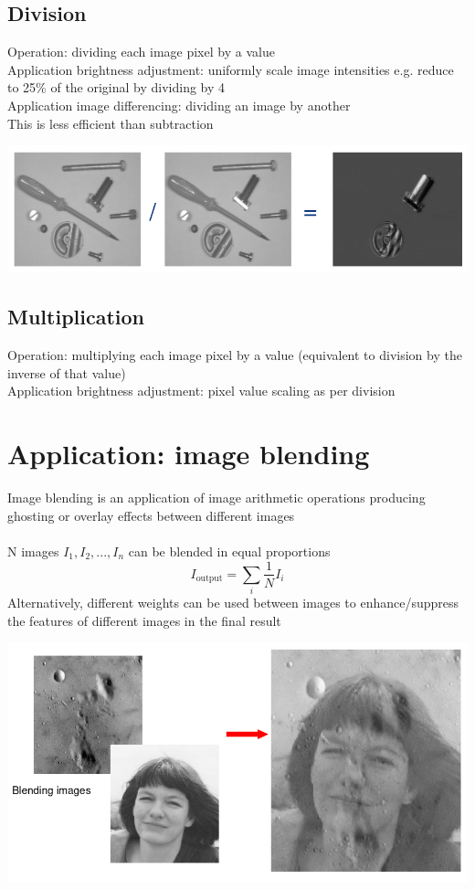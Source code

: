 \documentclass{article}[18pt]
\begin{document}
\subsection{Division}
Operation: dividing each image pixel by a value\\
Application brightness adjustment: uniformly scale image intensities e.g. reduce to 25\% of the original by dividing by 4\\
Application image differencing: dividing an image by another\\
This is less efficient than subtraction
\begin{center}
	\includegraphics[scale=0.7]{division}
\end{center}
\subsection{Multiplication}
Operation: multiplying each image pixel by a value (equivalent to division by the inverse of that value)\\
Application brightness adjustment: pixel value scaling as per division 
\section{Application: image blending}
Image blending is an application of image arithmetic operations producing ghosting or overlay effects between different images\\
\\
N images $I_1,I_2,...,I_n$ can be blended in equal proportions
\[
I_{\text {output}}=\sum_{i} \frac{1}{N} I_{i}
\]
Alternatively, different weights can be used between images to enhance/suppress the features of different images in the final result
\begin{center}
	\includegraphics[scale=0.7]{image_blending}
\end{center}
\end{document}
